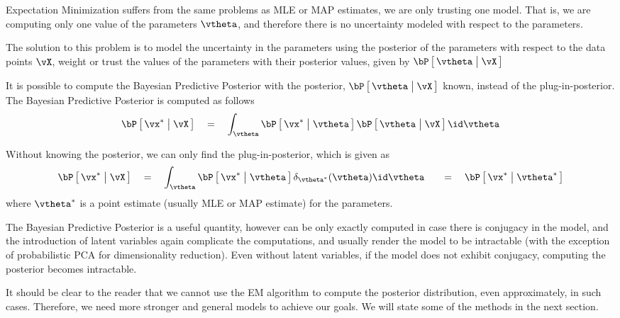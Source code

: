 \documentclass[11pt,a4paper]{article}
\begin{document}
Expectation Minimization suffers from the same problems as MLE or MAP estimates, we are only trusting one model. That is, we are computing only one value of the parameters $\vtheta$, and therefore there is no uncertainty modeled with respect to the parameters.

The solution to this problem is to model the uncertainty in the parameters using the posterior of the parameters with respect to the data points $\vX$, \ie weight or trust the values of the parameters with their posterior values, given by $\prob{\vtheta \pipe \vX}$

It is possible to compute the Bayesian Predictive Posterior with the posterior, \ie $\prob{\vtheta \pipe \vX}$ known, instead of the plug-in-posterior. The Bayesian Predictive Posterior is computed as follows
\begin{align*}
	\prob{\vx^{\ast} \pipe \vX} \eq \int_\vtheta \prob{\vx^{\ast} \pipe \vtheta} \prob{\vtheta \pipe \vX} \id \vtheta
\end{align*}

Without knowing the posterior, we can only find the plug-in-posterior, which is given as
\begin{align*}
	\prob{\vx^{\ast} \pipe \vX} &\eq \int_{\vtheta} \prob{\vx^{\ast} \pipe \vtheta} \delta_{\vtheta^{\ast}}(\vtheta) \id \vtheta
	&\eq \prob{\vx^{\ast} \pipe \vtheta^{\ast}}
\end{align*}
where $\vtheta^{\ast}$ is a point estimate (usually MLE or MAP estimate) for the parameters.

The Bayesian Predictive Posterior is a useful quantity, however can be only exactly computed in case there is conjugacy in the model, and the introduction of latent variables again complicate the computations, and usually render the model to be intractable (with the exception of probabilistic PCA for dimensionality reduction). Even without latent variables, if the model does not exhibit conjugacy, computing the posterior becomes intractable.

It should be clear to the reader that we cannot use the EM algorithm to compute the posterior distribution, even approximately, in such cases. Therefore, we need more stronger and general models to achieve our goals. We will state some of the methods in the next section.
\end{document}
